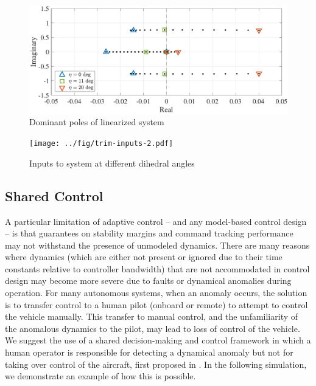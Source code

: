 \documentclass[english]{ifacconf}
\begin{document}
\begin{figure}[htbp]
	\centering
	\includegraphics[width=0.95\columnwidth]{../fig/trim-poles-zoom-2.pdf}
	\caption{Dominant poles of linearized system}
	\label{fig:trim-poles-zoom}
\end{figure}

\begin{figure}[htbp]
	\centering
	\texttt{[image: ../fig/trim-inputs-2.pdf]}
	\caption{Inputs to system at different dihedral angles}
	\label{fig:trim-inputs}
\end{figure}

\subsection{Shared Control}
A particular limitation of adaptive control -- and any model-based control design -- is that guarantees on stability margins and command tracking performance may not withstand the presence of unmodeled dynamics. There are many reasons where dynamics (which are either not present or ignored due to their time constants relative to controller bandwidth) that are not accommodated in control design may become more severe due to faults or dynamical anomalies during operation. For many autonomous systems, when an anomaly occurs, the solution is to transfer control to a human pilot (onboard or remote) to attempt to control the vehicle manually. This transfer to manual control, and the unfamiliarity of the anomalous dynamics to the pilot, may lead to loss of control of the vehicle. We suggest the use of a shared decision-making and control framework in which a human operator is responsible for detecting a dynamical anomaly but not for taking over control of the aircraft, first proposed in \cite{thomsen2018shared}. In the following simulation, we demonstrate an example of how this is possible.
\end{document}
